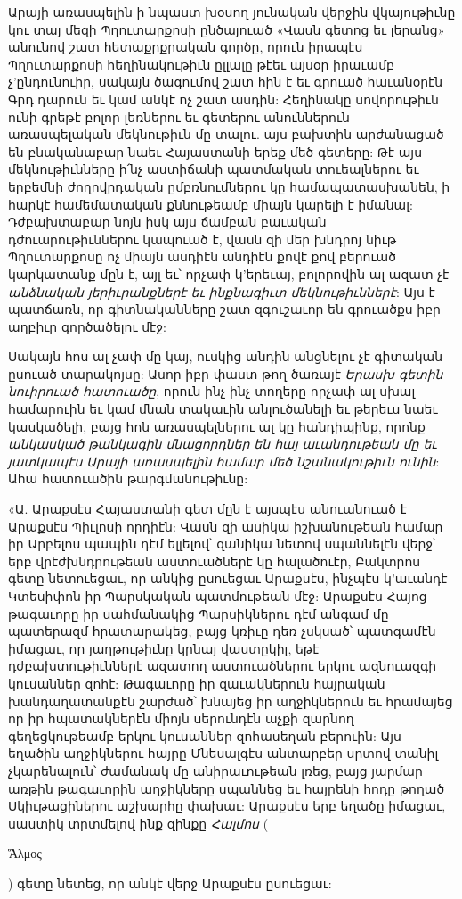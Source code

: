 \documentclass{article}
\begin{document}
{Արայի առասպելին ի նպաստ խօսող յունական վերջին վկայութիւնը կու տայ մեզի Պղուտարքոսի ընծայուած «Վասն գետոց եւ լերանց» անունով շատ հետաքրքրական գործը, որուն իրապէս Պղուտարքոսի հեղինակութիւն ըլլալը թէեւ այսօր իրաւամբ չ'ընդունուիր, սակայն ծագումով շատ հին է եւ գրուած հաւանօրէն Գրդ դարուն եւ կամ անկէ ոչ շատ ասդին: Հեղինակը սովորութիւն ունի գրեթէ բոլոր լեռներու եւ գետերու անուններուն առասպելական մեկնութիւն մը տալու. այս բախտին արժանացած են բնականաբար նաեւ Հայաստանի երեք մեծ գետերը: Թէ այս մեկնութիւնները ի՛նչ աստիճանի պատմական տուեալներու եւ երբեմնի ժողովրդական ըմբռնումներու կը համապատասխանեն, ի հարկէ համեմատական քննութեամբ միայն կարելի է իմանալ: Դժբախտաբար նոյն իսկ այս ճամբան բաւական դժուարութիւններու կապուած է, վասն զի մեր խնդրոյ նիւթ Պղուտարքոսը ոչ միայն ասդիէն անդիէն քովէ քով բերուած կարկատանք մըն է, այլ եւ՝ որչափ կ'երեւայ, բոլորովին ալ ազատ չէ \emph{անձնական յերիւրանքներէ եւ ինքնագիւտ մեկնութիւններէ}: Այս է պատճառն, որ գիտնականները շատ զգուշաւոր են գրուածքս իբր աղբիւր գործածելու մէջ:

Սակայն հոս ալ չափ մը կայ, ուսկից անդին անցնելու չէ գիտական ըսուած տարակոյսը: Ասոր իբր փաստ թող ծառայէ \emph{Երասխ գետին նուիրուած հատուածը}, որուն ինչ ինչ տողերը որչափ ալ սխալ համարուին եւ կամ մնան տակաւին անլուծանելի եւ թերեւս նաեւ կասկածելի, բայց հոն առասպելներու ալ կը հանդիպինք, որոնք \emph{անկասկած թանկագին մնացորդներ են հայ աւանդութեան մը եւ յատկապէս Արայի առասպելին համար մեծ նշանակութիւն ունին}: Ահա հատուածին թարգմանութիւնը:

«Ա. Արաքսէս Հայաստանի գետ մըն է այսպէս անուանուած է Արաքսէս Պիւլոսի որդիէն: Վասն զի ասիկա իշխանութեան համար իր Արբելոս պապին դէմ ելլելով՝ զանիկա նետով սպաննելէն վերջ՝ երբ վրէժխնդրութեան աստուածներէ կը հալածուէր, Բակտրոս գետը նետուեցաւ, որ անկից ըսուեցաւ Արաքսէս, ինչպէս կ'աւանդէ Կտեսիփոն իր Պարսկական պատմութեան մէջ: Արաքսէս Հայոց թագաւորը իր սահմանակից Պարսիկներու դէմ անգամ մը պատերազմ հրատարակեց, բայց կռիւը դեռ չսկսած՝ պատգամէն իմացաւ, որ յաղթութիւնը կրնայ վաստըկիլ, եթէ դժբախտութիւններէ ազատող աստուածներու երկու ազնուազգի կուսաններ զոհէ: Թագաւորը իր զաւակներուն հայրական խանդաղատանքէն շարժած՝ խնայեց իր աղջիկներուն եւ հրամայեց որ իր հպատակներէն միոյն սերունդէն աչքի զարնող գեղեցկութեամբ երկու կուսաններ զոհասեղան բերուին: Այս եղածին աղջիկներու հայրը Մնեսալգէս անտարբեր սրտով տանիլ չկարենալուն՝ ժամանակ մը անիրաւութեան լռեց, բայց յարմար առթին թագաւորին աղջիկները սպաննեց եւ հայրենի հոդը թողած Սկիւթացիներու աշխարհը փախաւ: Արաքսէս երբ եղածը իմացաւ, սաստիկ տրտմելով ինք զինքը \emph{Հալմոս} (\begin{greek}Ἅλμος\end{greek}) գետը նետեց, որ անկէ վերջ Արաքսէս ըսուեցաւ:

}
\end{document}
